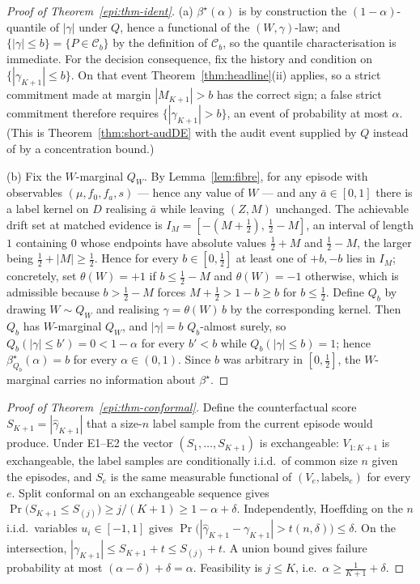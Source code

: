 \begin{proof}[Proof of Theorem~\ref{epi:thm-ident}]
(a) $\beta^\star(\alpha)$ is by construction the $(1-\alpha)$-quantile of $|\gamma|$ under $Q$, hence
a functional of the $(W,\gamma)$-law; and $\{|\gamma|\le b\}=\{P\in\mathcal C_b\}$ by the definition
of $\mathcal C_b$, so the quantile characterisation is immediate. For the decision consequence, fix
the history and condition on $\{|\gamma_{K+1}|\le b\}$. On that event
Theorem~\ref{thm:headline}(ii) applies, so a strict commitment made at margin $|M_{K+1}|>b$ has the
correct sign; a false strict commitment therefore requires $\{|\gamma_{K+1}|>b\}$, an event of
probability at most $\alpha$. (This is Theorem~\ref{thm:short-audDE} with the audit event supplied by
$Q$ instead of by a concentration bound.)

(b) Fix the $W$-marginal $Q_W$. By Lemma~\ref{lem:fibre}, for any episode with observables
$(\mu,f_0,f_a,s)$ --- hence any value of $W$ --- and any $\bar a\in[0,1]$ there is a label kernel on
$D$ realising $\bar a$ while leaving $(Z,M)$ unchanged. The achievable drift set at matched evidence
is $I_M=[-(M+\tfrac12),\,\tfrac12-M]$, an interval of length $1$ containing $0$ whose endpoints have
absolute values $\tfrac12+M$ and $\tfrac12-M$, the larger being $\tfrac12+|M|\ge\tfrac12$. Hence for
every $b\in[0,\tfrac12]$ at least one of $+b,-b$ lies in $I_M$; concretely, set
$\theta(W)=+1$ if $b\le\tfrac12-M$ and $\theta(W)=-1$ otherwise, which is admissible because
$b>\tfrac12-M$ forces $M+\tfrac12>1-b\ge b$ for $b\le\tfrac12$. Define $Q_b$ by drawing
$W\sim Q_W$ and realising $\gamma=\theta(W)\,b$ by the corresponding kernel. Then $Q_b$ has
$W$-marginal $Q_W$, and $|\gamma|=b$ $Q_b$-almost surely, so
$Q_b(|\gamma|\le b')=0<1-\alpha$ for every $b'<b$ while $Q_b(|\gamma|\le b)=1$; hence
$\beta^\star_{Q_b}(\alpha)=b$ for every $\alpha\in(0,1)$. Since $b$ was arbitrary in
$[0,\tfrac12]$, the $W$-marginal carries no information about $\beta^\star$.
\end{proof}

\begin{proof}[Proof of Theorem~\ref{epi:thm-conformal}]
Define the counterfactual score $S_{K+1}=|\widehat\gamma_{K+1}|$ that a size-$n$ label sample from
the current episode would produce. Under E1--E2 the vector $(S_1,\dots,S_{K+1})$ is exchangeable:
$V_{1:K+1}$ is exchangeable, the label samples are conditionally i.i.d.\ of common size $n$ given the
episodes, and $S_e$ is the same measurable functional of $(V_e,\text{labels}_e)$ for every $e$. Split
conformal on an exchangeable sequence gives
$\Pr\bigl(S_{K+1}\le S_{(j)}\bigr)\ge j/(K+1)\ge1-\alpha+\delta$. Independently, Hoeffding on the
$n$ i.i.d.\ variables $u_i\in[-1,1]$ gives
$\Pr\bigl(|\widehat\gamma_{K+1}-\gamma_{K+1}|>t(n,\delta)\bigr)\le\delta$. On the intersection,
$|\gamma_{K+1}|\le S_{K+1}+t\le S_{(j)}+t$. A union bound gives failure probability at most
$(\alpha-\delta)+\delta=\alpha$. Feasibility is $j\le K$, i.e.\ $\alpha\ge\tfrac1{K+1}+\delta$.
\end{proof}


